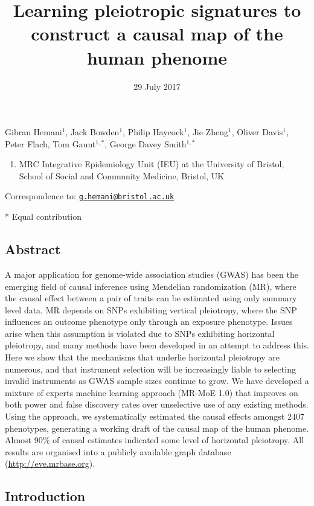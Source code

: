 \documentclass[]{article}
\title{Learning pleiotropic signatures to construct a causal map of the human
phenome}
\author{}
\date{29 July 2017}
\providecommand{\tightlist}{%
  \setlength{\itemsep}{0pt}\setlength{\parskip}{0pt}}
\begin{document}
\maketitle

Gibran Hemani\(^1\), Jack Bowden\(^1\), Philip Haycock\(^1\), Jie
Zheng\(^1\), Oliver Davis\(^1\), Peter Flach, Tom Gaunt\(^{1,*}\),
George Davey Smith\(^{1,*}\)

\begin{enumerate}
\def\labelenumi{\arabic{enumi}.}
\tightlist
\item
  MRC Integrative Epidemiology Unit (IEU) at the University of Bristol,
  School of Social and Community Medicine, Bristol, UK
\end{enumerate}

Correspondence to:
\href{mailto:g.hemani@bristol.ac.uk}{\nolinkurl{g.hemani@bristol.ac.uk}}

* Equal contribution

\subsection{Abstract}\label{abstract}

A major application for genome-wide association studies (GWAS) has been
the emerging field of causal inference using Mendelian randomization
(MR), where the causal effect between a pair of traits can be estimated
using only summary level data. MR depends on SNPs exhibiting vertical
pleiotropy, where the SNP influences an outcome phenotype only through
an exposure phenotype. Issues arise when this assumption is violated due
to SNPs exhibiting horizontal pleiotropy, and many methods have been
developed in an attempt to address this. Here we show that the
mechanisms that underlie horizontal pleiotropy are numerous, and that
instrument selection will be increasingly liable to selecting invalid
instruments as GWAS sample sizes continue to grow. We have developed a
mixture of experts machine learning approach (MR-MoE 1.0) that improves
on both power and false discovery rates over unselective use of any
existing methods. Using the approach, we systematically estimated the
causal effects amongst 2407 phenotypes, generating a working draft of
the causal map of the human phenome. Almost 90\% of causal estimates
indicated some level of horizontal pleiotropy. All results are organised
into a publicly available graph database (\url{http://eve.mrbase.org}).

\subsection{Introduction}\label{introduction}
\end{document}
